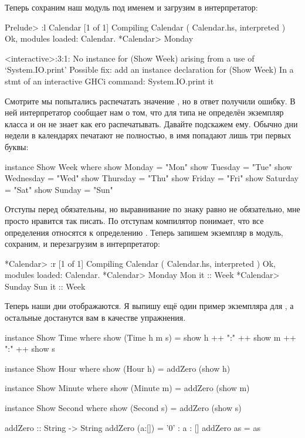 Теперь сохраним наш модуль под именем  и загрузим в
интерпретатор:


\begin{code}
Prelude> :l Calendar
[1 of 1] Compiling Calendar         ( Calendar.hs, interpreted )
Ok, modules loaded: Calendar.
*Calendar> Monday

<interactive>:3:1:
    No instance for (Show Week)
      arising from a use of `System.IO.print'
    Possible fix: add an instance declaration for (Show Week)
    In a stmt of an interactive GHCi command: System.IO.print it
\end{code}

Смотрите мы попытались распечатать значение , но в ответ
получили ошибку. В ней интерпретатор сообщает нам о том, что для типа
 не определён экземпляр класса  и он не знает как его
распечатывать. Давайте подскажем ему. Обычно дни недели в календарях
печатают не полностью, в имя попадают лишь три первых буквы:


\begin{code}
instance Show Week where
    show Monday     = "Mon"
    show Tuesday    = "Tue"
    show Wednesday  = "Wed"
    show Thursday   = "Thu"  
    show Friday     = "Fri" 
    show Saturday   = "Sat"
    show Sunday     = "Sun"
\end{code}

Отступы перед  обязательны, но выравнивание по знаку равно не
обязательно, мне просто нравится так писать. По отступам компилятор
понимает, что все определения относятся к определению .
Теперь запишем экземпляр в модуль, сохраним, и перезагрузим в
интерпретатор:


\begin{code}
*Calendar> :r
[1 of 1] Compiling Calendar         ( Calendar.hs, interpreted )
Ok, modules loaded: Calendar.
*Calendar> Monday
Mon
it :: Week
*Calendar> Sunday
Sun
it :: Week
\end{code}

Теперь наши дни отображаются. Я выпишу ещё один пример экземпляра для
, а остальные достанутся вам в качестве упражнения.


\begin{code}
instance Show Time where
    show (Time h m s) = show h ++ ":" ++ show m ++ ":" ++ show s

instance Show Hour where
    show (Hour h) = addZero (show h)

instance Show Minute where
    show (Minute m) = addZero (show m)

instance Show Second where
    show (Second s) = addZero (show s)

addZero :: String -> String
addZero (a:[]) = '0' : a : []
addZero as     = as
\end{code}

